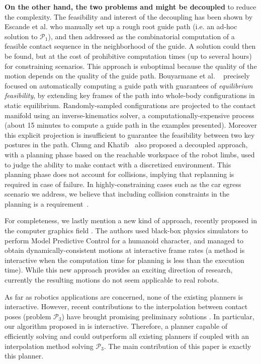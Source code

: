 \textbf{On the other hand, the two problems \Pa and \Pb might be decoupled} to reduce the complexity. The feasibility and interest of the decoupling has been shown by Escande et al. \cite{DBLP:conf/iser/EscandeKMG08} who manually set up a rough root guide path (i.e. an ad-hoc solution to $\mathcal{P}_1$), and then addressed \Pb as the combinatorial computation of a feasible contact sequence in the neighborhood of the guide. A solution could then be found, %
but at the cost of prohibitive computation times (up to several hours) for constraining scenarios. This approach is suboptimal because the quality of the motion depends on the quality of the guide path. Bouyarmane et al. ~\cite{Bouyarmane2009} precisely focused on automatically computing a guide path with guarantees of \textit{equilibrium feasibility}, by extending key frames of the path into whole-body configurations in static equilibrium. Randomly-sampled configurations are projected to the contact manifold using an inverse-kinematics solver, a computationally-expensive process (about 15 minutes to compute a guide path in the examples presented). Moreover this explicit projection is insufficient to guarantee the feasibility between two key postures in the path. Chung and Khatib~\cite{7140082} also proposed a decoupled approach, with a planning phase based on the reachable workspace of the robot limbs, used to judge the ability to make contact with a discretized environment. This planning phase does not account for collisions, implying that replanning is required in case of failure. In highly-constraining cases such as the car egress scenario we address, we believe that including collision constraints in the planning is a requirement~\citep{tonneauisrr15,grey2017footstep}.

For completeness, we lastly mention a new kind of approach, recently proposed in the computer graphics field \citep{hamalainen_cpbp_2015}. The authors
used black-box physics simulators to perform Model Predictive Control for a humanoid character, and managed to obtain dynamically-consistent motions
at \gls{interactive} frame rates (a method is interactive when the computation time for planning is less than the
execution time). While this new approach provides an exciting direction of research, currently the resulting motions
 do not seem applicable to real robots.

As far as robotics applications are concerned, none of the existing planners is \gls{interactive}.
However, recent contributions to the interpolation between contact poses (problem $\mathcal{P}_3$) have brought promising preliminary solutions \citep{Hauser2014, herzog2015trajectory, Park116, Carpentier2016}. In particular, our algorithm proposed in \cite{Carpentier2016} is \gls{interactive}.
Therefore, a planner capable of efficiently solving \Pa and \Pb could outperform all existing planners if coupled with an interpolation method solving $\mathcal{P}_3$.
The main contribution of this paper is exactly this planner.


